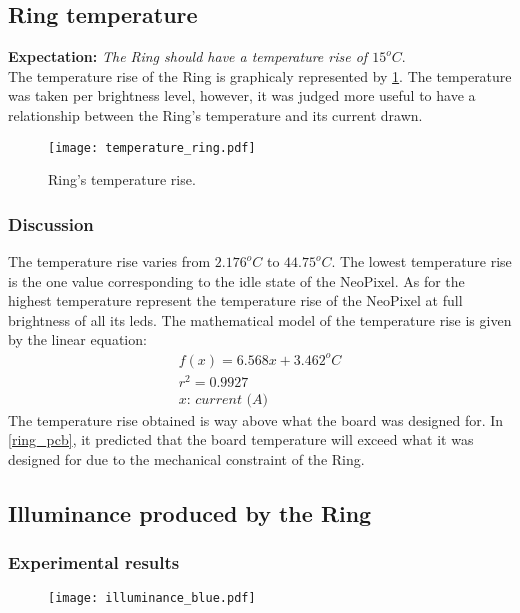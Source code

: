 \subsection{Ring temperature}
\textbf{Expectation:} \textit{The Ring should have a temperature rise of $15^oC$}.\\
The temperature rise of the Ring is graphicaly represented by \cref{fig:temperature_ring}. The temperature was taken per brightness level, however, it was judged more useful to have a relationship between the Ring's temperature and its current drawn. 
\begin{figure}[ht]
	\centering
	\texttt{[image: temperature\_ring.pdf]}
	\caption{Ring's temperature rise.}
	\label{fig:temperature_ring}
\end{figure}

\subsubsection{Discussion}
The temperature rise varies from $2.176^oC$ to $44.75^oC$. The lowest temperature rise is the one value corresponding to the idle state of the NeoPixel. As for the highest temperature represent the temperature rise of the NeoPixel at full brightness of all its leds. The mathematical model of the temperature rise is given by the linear equation:
\begin{equation}
\label{eq:f_temp}
\begin{multlined}
f(x) = 6.568x+3.462 ^oC\\
r^2 = 0.9927\\
\textit{$x$: current (A)}
\end{multlined}
\end{equation}  
The temperature rise obtained is way above what the board was designed for. In \cref{ring_pcb}, it predicted that the board temperature will exceed what it was designed for due to the mechanical constraint of the Ring. \\

\subsection{Illuminance produced by the Ring}
\subsubsection{Experimental results}

\begin{figure}[ht]
	\centering
	\texttt{[image: illuminance\_blue.pdf]}
	\caption{}
	\label{fig:illuminance_blue}
\end{figure}


